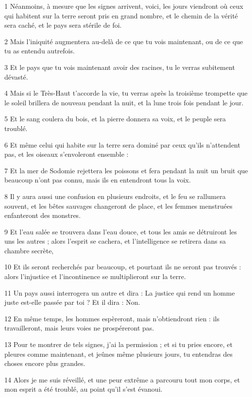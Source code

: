 \par 1 Néanmoins, à mesure que les signes arrivent, voici, les jours viendront où ceux qui habitent sur la terre seront pris en grand nombre, et le chemin de la vérité sera caché, et le pays sera stérile de foi.
\par 2 Mais l'iniquité augmentera au-delà de ce que tu vois maintenant, ou de ce que tu as entendu autrefois.
\par 3 Et le pays que tu vois maintenant avoir des racines, tu le verras subitement dévasté.
\par 4 Mais si le Très-Haut t'accorde la vie, tu verras après la troisième trompette que le soleil brillera de nouveau pendant la nuit, et la lune trois fois pendant le jour.
\par 5 Et le sang coulera du bois, et la pierre donnera sa voix, et le peuple sera troublé.
\par 6 Et même celui qui habite sur la terre sera dominé par ceux qu'ils n'attendent pas, et les oiseaux s'envoleront ensemble :
\par 7 Et la mer de Sodomie rejettera les poissons et fera pendant la nuit un bruit que beaucoup n'ont pas connu, mais ils en entendront tous la voix.
\par 8 Il y aura aussi une confusion en plusieurs endroits, et le feu se rallumera souvent, et les bêtes sauvages changeront de place, et les femmes menstruées enfanteront des monstres.
\par 9 Et l'eau salée se trouvera dans l'eau douce, et tous les amis se détruiront les uns les autres ; alors l'esprit se cachera, et l'intelligence se retirera dans sa chambre secrète,
\par 10 Et ils seront recherchés par beaucoup, et pourtant ils ne seront pas trouvés : alors l'injustice et l'incontinence se multiplieront sur la terre.
\par 11 Un pays aussi interrogera un autre et dira : La justice qui rend un homme juste est-elle passée par toi ? Et il dira : Non.
\par 12 En même temps, les hommes espèreront, mais n'obtiendront rien : ils travailleront, mais leurs voies ne prospéreront pas.
\par 13 Pour te montrer de tels signes, j'ai la permission ; et si tu pries encore, et pleures comme maintenant, et jeûnes même plusieurs jours, tu entendras des choses encore plus grandes.
\par 14 Alors je me suis réveillé, et une peur extrême a parcouru tout mon corps, et mon esprit a été troublé, au point qu'il s'est évanoui.
